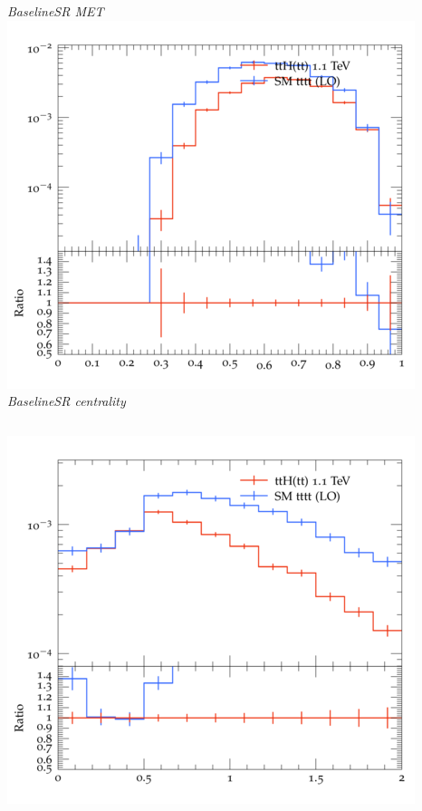 \documentclass{beamer}
\begin{document}
\begin{frame}
\begin{columns}
\textit{\small BaselineSR MET}
\includegraphics[width=\textwidth]{../plots/ttH_1100/tttt_ttH_1LOS/BaselineSR_centrality.png}\\
\textit{\small BaselineSR centrality}
\end{columns}
\begin{columns}
\includegraphics[width=\textwidth]{../plots/ttH_1100/tttt_ttH_1LOS/BaselineSR_deltaR_bl_min.png}\\

\end{columns}
\end{frame}
\end{document}
